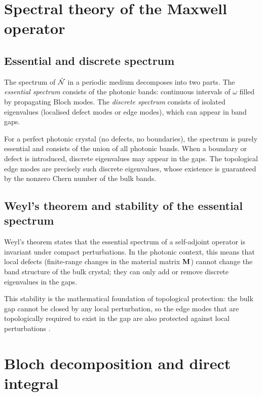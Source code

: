 \section{Spectral theory of the Maxwell operator}
\label{sec:appA-spectral-theory}

\subsection{Essential and discrete spectrum}
\label{sec:appA-essential-discrete}

The spectrum of $\hat{\mathcal{N}}$ in a periodic medium decomposes into two
parts.  The \emph{essential spectrum} consists of the photonic bands:
continuous intervals of $\omega$ filled by propagating Bloch modes.
The \emph{discrete spectrum} consists of isolated eigenvalues
(localised defect modes or edge modes), which can appear in band gaps.

For a perfect photonic crystal (no defects, no boundaries), the
spectrum is purely essential and consists of the union of all photonic
bands.  When a boundary or defect is introduced, discrete eigenvalues
may appear in the gaps.  The topological edge modes are precisely such
discrete eigenvalues, whose existence is guaranteed by the nonzero
Chern number of the bulk bands.

\subsection{Weyl's theorem and stability of the essential spectrum}
\label{sec:appA-weyl}

Weyl's theorem states that the essential spectrum of a self-adjoint
operator is invariant under compact perturbations.  In the photonic
context, this means that local defects (finite-range changes in the
material matrix $\mathbf{M}$) cannot change the band structure of the bulk
crystal; they can only add or remove discrete eigenvalues in the gaps.

This stability is the mathematical foundation of topological
protection: the bulk gap cannot be closed by any local perturbation,
so the edge modes that are topologically required to exist in the gap
are also protected against local perturbations
\cite{ozawa2018topological}.

\section{Bloch decomposition and direct integral}
\label{sec:appA-bloch-decomposition}

